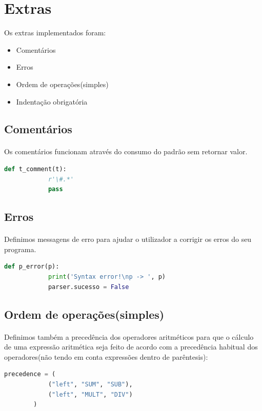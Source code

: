 \documentclass[11pt,a4paper]{report}
\begin{document}
    \section{Extras}
    Os extras implementados foram:
    \begin{itemize}
        \item Comentários
        \item Erros
        \item Ordem de operações(simples)
        \item Indentação obrigatória
    \end{itemize}

    \subsection{Comentários}
    \paragraph{}
    Os comentários funcionam através do consumo do padrão sem retornar valor.
    \begin{lstlisting}[language=Python]
        def t_comment(t):
            r'\#.*'
            pass
    \end{lstlisting}

    \subsection{Erros}
    \paragraph{}
    Definimos messagens de erro para ajudar o utilizador a corrigir os erros do seu programa.
    \begin{lstlisting}[language=Python]
        def p_error(p):
            print('Syntax error!\np -> ', p)
            parser.sucesso = False
    \end{lstlisting}

    \subsection{Ordem de operações(simples)}
    \paragraph{}
    Definimos também a precedência dos operadores aritméticos para que o cálculo de uma expressão aritmética seja
     feito de acordo com a precedência habitual dos operadores(não tendo em conta expressões dentro de parêntesis):
    \begin{lstlisting}[language=Python]
        precedence = (
            ("left", "SUM", "SUB"),
            ("left", "MULT", "DIV")
        )
    \end{lstlisting}
\end{document}

